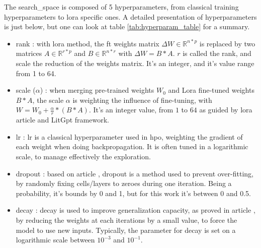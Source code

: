 The \gls{search_space}  is composed of 5 \glspl{hyperparameter}, from classical training \glspl{hyperparameter} to \acrshort{lora} specific ones. A detailed presentation of \glspl{hyperparameter} is just below, but one can look at table \ref{tab:hyperparam_table} for a summary.
\begin{itemize}
    \item \Gls{rank} : with \acrshort{lora} method, the \gls{ft} weights matrix $\Delta W \in \mathbb{R}^{n*p}$ is replaced by two matrices $A \in \mathbb{R}^{r*p}$ and $B \in \mathbb{R}^{n*r}$ with $\Delta W = B*A$. $r$ is called the \gls{rank}, and scale the reduction of the weights matrix. It's an integer, and it's value range from 1 to 64.
    \item \Gls{scale} ($\alpha$) : when merging pre-trained weights $W_0$ and Lora fine-tuned weights $B*A$, the scale $\alpha$ is weighting the influence of fine-tuning, with $W = W_0 + \frac{\alpha}{r} * (B*A)$. It's an integer value, from $1$ to $64$ as guided by \acrshort{lora} article and LitGpt framework.
    \item \Gls{lr} : \gls{lr} is a classical \gls{hyperparameter} used in \acrshort{hpo}, weighting the gradient of each weight when doing backpropagation. It is often tuned in a logarithmic scale, to manage effectively the exploration. 
    \item \Gls{dropout} : based on article \cite{srivastava_dropout_2014}, dropout is a method used to prevent over-fitting, by randomly fixing cells/layers to zeroes during one iteration. Being a probability, it's bounds by 0 and 1, but for this work it's between 0 and 0.5.
    \item \Gls{decay} : \gls{decay} is used to improve generalization capacity, as proved in article \cite{krogh_simple_1991}, by reducing the weights at each iterations by a small value, to force the model to use new inputs. Typically, the parameter for \gls{decay} is set on a logarithmic scale between $10^{-3}$ and $10^{-1}$.
\end{itemize}






